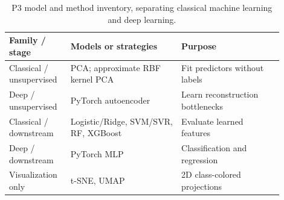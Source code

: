 \begin{table}[!htbp]\centering\footnotesize
\setlength{\tabcolsep}{5pt}
\caption{P3 model and method inventory, separating classical machine learning and deep learning.}\label{tab:p3methods}
\begin{tabular}{@{}p{0.19\linewidth}p{0.37\linewidth}p{0.34\linewidth}@{}}\toprule
\textbf{Family / stage} & \textbf{Models or strategies} & \textbf{Purpose}\\\midrule
\rowcolor{gold!10}
Classical / unsupervised & PCA; approximate RBF kernel PCA & Fit predictors without labels\\
\rowcolor{teal!9}
Deep / unsupervised & PyTorch autoencoder & Learn reconstruction bottlenecks\\
\rowcolor{gold!10}
Classical / downstream & Logistic/Ridge, SVM/SVR, RF, XGBoost & Evaluate learned features\\
\rowcolor{teal!9}
Deep / downstream & PyTorch MLP & Classification and regression\\
\rowcolor{mist}
Visualization only & t-SNE, UMAP & 2D class-colored projections\\
\bottomrule\end{tabular}
\end{table}

